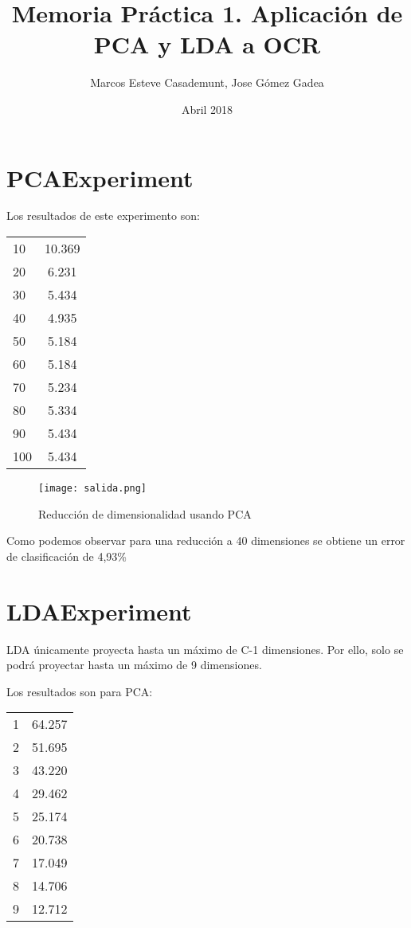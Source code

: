 \documentclass[11pt,oneside,a4paper]{article}
\title{Memoria Práctica 1. Aplicación de PCA y LDA a OCR}
\author{Marcos Esteve Casademunt, Jose Gómez Gadea}
\date{Abril 2018}
\begin{document}
\maketitle
\tableofcontents
\listoffigures

\section{PCAExperiment}
Los resultados de este experimento son:

\begin{center}
\begin{tabular}{l c}
10 &	10.369 \\
20	 & 6.231 \\
30 &	5.434 \\
40	 & 4.935 \\
50	 & 5.184 \\
60 &	5.184 \\
70	 & 5.234 \\
80 &	5.334 \\
90 &	5.434 \\
100 & 	5.434 \\
\end{tabular}
\end{center}
\begin{figure}
\texttt{[image: salida.png]}
\caption{Reducción de dimensionalidad usando PCA }
\end{figure}

Como podemos observar para una reducción a 40 dimensiones se obtiene un error de clasificación de 4,93\%

\section{LDAExperiment}
LDA únicamente proyecta hasta un máximo de C-1 dimensiones. Por ello, solo se podrá proyectar hasta un máximo de 9 dimensiones.

Los resultados son para PCA:

\begin{center}
\begin{tabular}{l c}
1 &	64.257\\
2 &	51.695\\
3 &	43.220\\
4 &	29.462\\
5 &	25.174\\
6 &	20.738\\
7 &	17.049\\
8	& 14.706\\
9	& 12.712\\
\end{tabular}
\end{center}
\end{document}
